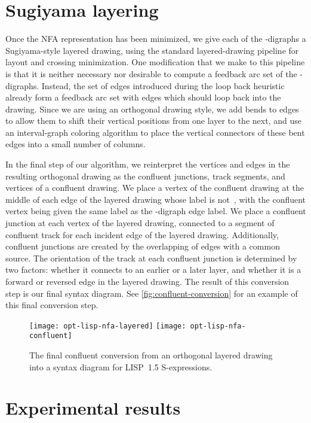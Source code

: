 \documentclass[10pt]{llncs}
\begin{document}
\section{Sugiyama layering}
Once the NFA representation has been minimized, we give each of the -digraphs a Sugiyama-style layered drawing, using the standard layered-drawing pipeline for layout and crossing minimization. One modification that we make to this pipeline is that it is neither necessary nor desirable to compute a feedback arc set of the -digraphs. Instead, the set of edges introduced during the loop back heuristic already form a feedback arc set with edges which should loop back into the drawing. Since we are using an orthogonal drawing style, we add bends to edges to allow them to shift their vertical positions from one layer to the next, and use an interval-graph coloring algorithm to place the vertical connectors of these bent edges into a small number of columns.

In the final step of our algorithm, we reinterpret the vertices and edges in the resulting orthogonal drawing as the confluent junctions, track segments, and vertices of a confluent drawing. We place a vertex of the confluent drawing at the middle of each edge of the layered drawing whose label is not~, with the confluent vertex being given the same label as the -digraph edge label.
We place a confluent junction at each vertex of the layered drawing, connected to a segment of confluent track for each incident edge of the layered drawing. Additionally, confluent junctions are created by the overlapping of edges with a common source. The orientation of the track at each confluent junction is determined by two factors: whether it connects to an earlier or a later layer, and whether it is a forward or reversed edge in the layered drawing. The result of this conversion step is our final syntax diagram. See \autoref{fig:confluent-conversion} for an example of this final conversion step.

\begin{figure}
\centering
\texttt{[image: opt-lisp-nfa-layered]}
\hfill
\texttt{[image: opt-lisp-nfa-confluent]}
\caption{The final confluent conversion from an orthogonal layered drawing into a syntax diagram for LISP~1.5 S-expressions.}
\label{fig:confluent-conversion}
\end{figure}

\section{Experimental results}
\end{document}

